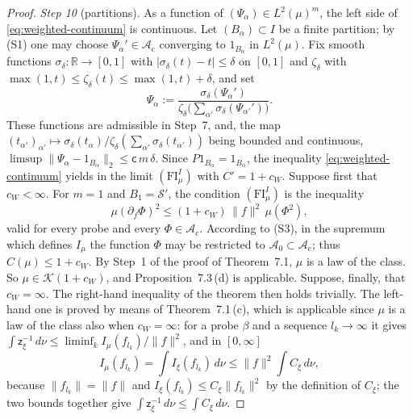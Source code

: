 \documentclass[11pt,letterpaper,reqno]{amsart}
\theoremstyle{definition}
\begin{document}
\begin{proof}
\emph{Step 10} (partitions).
As a function of $(\Psi_\alpha)\in L^2(\mu)^m$, the left side of \eqref{eq:weighted-continuum} is continuous.
Let $(B_\alpha)\subset I$ be a finite partition; by (S1) one may choose $\Psi_\alpha'\in\mathcal A_{\mathrm c}$ converging to $1_{B_\alpha}$ in $L^2(\mu)$.
Fix smooth functions $\sigma_\delta\colon\mathbb R\to[0,1]$ with $|\sigma_\delta(t)-t|\le\delta$ on $[0,1]$ and $\zeta_\delta$ with $\max(1,t)\le\zeta_\delta(t)\le\max(1,t)+\delta$, and set
\begin{equation*}
\Psi_\alpha:=\frac{\sigma_\delta(\Psi_\alpha')}{\zeta_\delta\bigl(\sum_{\alpha'}\sigma_\delta(\Psi_{\alpha'}')\bigr)}.
\end{equation*}
These functions are admissible in Step~7, and, the map $(t_{\alpha'})_{\alpha'}\mapsto\sigma_\delta(t_\alpha)/\zeta_\delta(\sum_{\alpha'}\sigma_\delta(t_{\alpha'}))$ being bounded and continuous, $\limsup\|\Psi_\alpha-1_{B_\alpha}\|_2\le\mathsf c\,m\,\delta$.
Since $P1_{B_\alpha}=1_{B_\alpha}$, the inequality \eqref{eq:weighted-continuum} yields in the limit $(\mathrm{FI}^I_\mu)$ with $C'=1+c_W$.
Suppose first that $c_W<\infty$.
For $m=1$ and $B_1=\mathcal S'$, the condition $(\mathrm{FI}^I_\mu)$ is the inequality
\begin{equation*}
\mu(\partial_f\Phi)^2\le(1+c_W)\,\|f\|^2\,\mu(\Phi^2),
\end{equation*}
valid for every probe and every $\Phi\in\mathcal A_{\mathrm c}$.
According to (S3), in the supremum which defines $I_\mu$ the function $\Phi$ may be restricted to $\mathcal A_0\subset\mathcal A_{\mathrm c}$; thus $C(\mu)\le1+c_W$.
By Step~1 of the proof of Theorem~7.1, $\mu$ is a law of the class.
So $\mu\in\mathcal K(1+c_W)$, and Proposition~7.3\,(d) is applicable.
Suppose, finally, that $c_W=\infty$.
The right-hand inequality of the theorem then holds trivially.
The left-hand one is proved by means of Theorem~7.1\,(c), which is applicable since $\mu$ is a law of the class also when $c_W=\infty$:
for a probe $\beta$ and a sequence $l_k\to\infty$ it gives $\int\mathsf z_\xi^{-1}\,d\nu\le\liminf_kI_\mu(f_{l_k})/\|f\|^2$,
and in $[0,\infty]$
\begin{equation*}
I_\mu(f_{l_k})=\int I_\xi(f_{l_k})\,d\nu\le\|f\|^2\int C_\xi\,d\nu,
\end{equation*}
because $\|f_{l_k}\|=\|f\|$ and $I_\xi(f_{l_k})\le C_\xi\|f_{l_k}\|^2$ by the definition of $C_\xi$;
the two bounds together give $\int\mathsf z_\xi^{-1}\,d\nu\le\int C_\xi\,d\nu$.


\end{proof}
\end{document}
